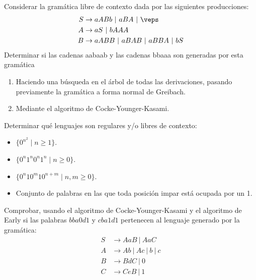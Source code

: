 \begin{ejercicio}\label{ej:1.6.5}
    Considerar la gramática libre de contexto dada por las siguientes producciones:
    \begin{align*}
        S &\rightarrow aABb\ |\ aBA\ |\ \veps \\
        A &\rightarrow aS\ |\ bAAA \\
        B &\rightarrow aABB\ |\ aBAB\ |\ aBBA\ |\ bS
    \end{align*}
    Determinar si las cadenas aabaab y las cadenas bbaaa son generadas por esta gramática
    \begin{enumerate}[label=\alph*)]
        \item Haciendo una búsqueda en el árbol de todas las derivaciones, pasando previamente la gramática a forma normal de Greibach.
        \item Mediante el algoritmo de Cocke-Younger-Kasami.
    \end{enumerate}
\end{ejercicio}

\begin{ejercicio}\label{ej:1.6.6}
    Determinar qué lenguajes son regulares y/o libres de contexto:
    \begin{itemize}
        \item $\{0^{n^2}\mid n\geq 1\}$.
        \item $\{0^n 1^n 0^n 1^n \mid n \geq 0\}$.
        \item $\{0^n 10^m 10^{n+m}\mid n,m\geq 0\}$.
        \item Conjunto de palabras en las que toda posición impar está ocupada por un 1.
    \end{itemize}
\end{ejercicio}

\begin{ejercicio}\label{ej:1.6.7}
    Comprobar, usando el algoritmo de Cocke-Younger-Kasami y el algoritmo de Early si las palabras $bba0d1$ y $cba1d1$ pertenecen al lenguaje generado por la gramática:
    \begin{align*}
        S &\rightarrow AaB\ |\ AaC \\
        A &\rightarrow Ab\ |\ Ac\ |\ b\ |\ c \\
        B &\rightarrow BdC\ |\ 0 \\
        C &\rightarrow CeB\ |\ 1
    \end{align*}
\end{ejercicio}

